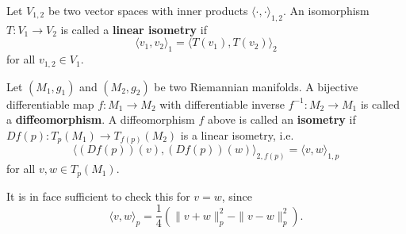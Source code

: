 \documentclass[letter-paper]{tufte-book}
\newenvironment{remark}[1][Remark]{\begin{trivlist}
\item[\hskip \labelsep {\bfseries #1}]}{\end{trivlist}}
\begin{document}
Let $V_{1,2}$ be two vector spaces with inner products $\langle\cdot,\cdot\rangle_{1,2}$. An isomorphism $T: V_1 \to V_2$ is called a \textbf{linear isometry} if
\begin{equation}
  \langle v_1, v_2 \rangle_1 = \langle T(v_1), T(v_2) \rangle_2
\end{equation}
for all $v_{1,2} \in V_1$.

Let $(M_1, g_1)$ and $(M_2, g_2)$ be two Riemannian manifolds. A bijective differentiable map $f: M_1 \to M_2$ with differentiable inverse $f^{-1}: M_2 \to M_1$ is called a \textbf{diffeomorphism}. A diffeomorphism $f$ above is called an \textbf{isometry} if $Df(p) : T_p(M_1) \to T_{f(p)}(M_2)$ is a linear isometry, i.e.
\begin{equation}
  \langle (Df(p))(v), (Df(p))(w)\rangle_{2, f(p)} = \langle v,w\rangle_{1, p}
\end{equation}
for all $v,w \in T_p(M_1)$.

\begin{remark}
  It is in face sufficient to check this for $v=w$, since
  \begin{equation*}
    \langle v,w\rangle_p = \frac{1}{4}\left(\|v+w\|^2_p - \|v-w\|^2_p\right).
  \end{equation*}
\end{remark}
\end{document}
